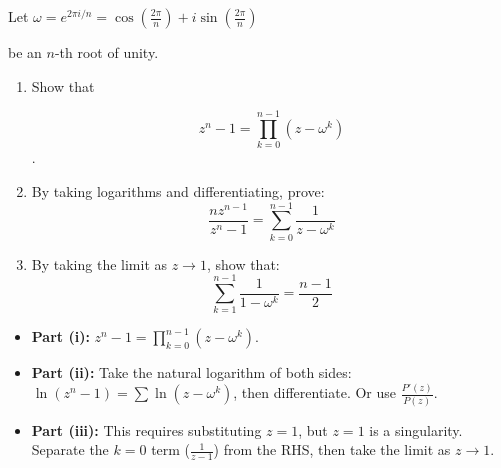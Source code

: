 \begin{problem}
Let $\omega = e^{2\pi i/n} = \cos\left(\frac{2\pi}{n}\right) + i \sin\left(\frac{2\pi}{n}\right)$ 

be an $n$-th root of unity.

\begin{enumerate}
    \item[(i)] Show that 
    
    \[ z^n - 1 = \prod_{k=0}^{n-1} (z - \omega^k) \].
    
    \item[(ii)] By taking logarithms and differentiating, prove:
    \[ \frac{n z^{n-1}}{z^n - 1} = \sum_{k=0}^{n-1} \frac{1}{z - \omega^k} \]
    
    \item[(iii)] By taking the limit as $z \to 1$, show that:
    \[ \sum_{k=1}^{n-1} \frac{1}{1 - \omega^k} = \frac{n-1}{2} \]
\end{enumerate}
\end{problem}

\begin{hint}
\begin{itemize}
    \item \textbf{Part (i):} $z^n - 1 = \prod_{k=0}^{n-1} (z - \omega^k)$.
    \item \textbf{Part (ii):} Take the natural logarithm of both sides: $\ln(z^n - 1) = \sum \ln(z - \omega^k)$, then differentiate. Or use $\frac{P'(z)}{P(z)}$.
    \item \textbf{Part (iii):} This requires substituting $z=1$, but $z=1$ is a singularity.
    Separate the $k=0$ term ($\frac{1}{z-1}$) from the RHS, then take the limit as $z \to 1$.
\end{itemize}
\end{hint}


